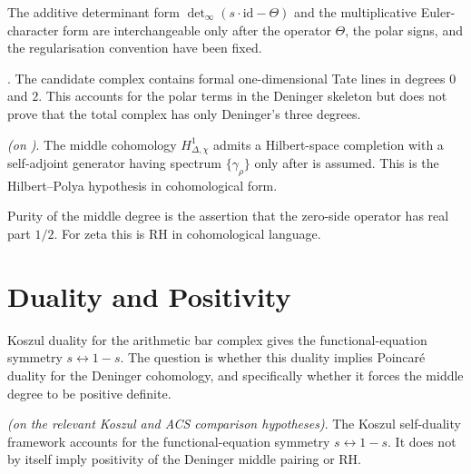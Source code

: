 \begin{remark}[normalisation]
\label{v4-arith:w8-a:rem:normalisation}
The additive determinant form
\(\det_\infty(s\cdot\mathrm{id}-\Theta)\) and the multiplicative
Euler-character form are interchangeable only after the operator
\(\Theta\), the polar signs, and the regularisation convention have
been fixed.
\end{remark}

\begin{proposition}
\label{v4-arith:w8-a:prop:H0-H2}
\ClaimStatusProvedHere. The candidate complex contains formal
one-dimensional Tate lines in degrees \(0\) and \(2\). This accounts
for the polar terms in the Deninger skeleton but does not prove that
the total complex has only Deninger's three degrees.
\end{proposition}

\begin{proposition}
\label{v4-arith:w8-a:prop:H1-structure}
\ClaimStatusConditional \emph{(on
)}. The middle cohomology
\(H^1_{\Delta,\chi}\) admits a Hilbert-space completion with a
self-adjoint generator having spectrum \(\{\gamma_\rho\}\) only
after  is assumed. This is
the Hilbert--Polya hypothesis in cohomological form.
\end{proposition}

\begin{remark}
\label{v4-arith:w8-a:rem:crit-line-weight}
Purity of the middle degree is the assertion that the zero-side
operator has real part \(1/2\). For zeta this is RH in cohomological
language.
\end{remark}

\section{Duality and Positivity}
\label{v4-arith:w8-a:poincare-duality}

Koszul duality for the arithmetic bar complex gives the
functional-equation symmetry \(s\leftrightarrow 1-s\). The question is
whether this duality implies Poincar\'{e} duality for the Deninger
cohomology, and specifically whether it forces the middle degree to be
positive definite.

\begin{theorem}
\label{v4-arith:w8-a:thm:triple-duality}
\ClaimStatusConditional \emph{(on the relevant Koszul and ACS
comparison hypotheses)}. The Koszul self-duality framework accounts
for the functional-equation symmetry \(s\leftrightarrow 1-s\). It does
not by itself imply positivity of the Deninger middle pairing or RH.
\end{theorem}

